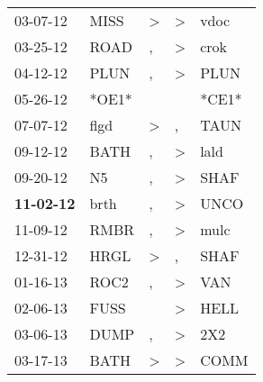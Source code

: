 \begin{supertabular}{p{0.07\textwidth}p{0.06\textwidth}p{0.02\textwidth}p{0.02\textwidth}p{0.06\textwidth}}
          03-07-12\textsuperscript{} &           MISS\textsuperscript{} &     \textgreater &     \textgreater &           vdoc\textsuperscript{} \\
          03-25-12\textsuperscript{} &           ROAD\textsuperscript{} &                , &     \textgreater &           crok\textsuperscript{} \\
          04-12-12\textsuperscript{} &           PLUN\textsuperscript{} &                , &     \textgreater &           PLUN\textsuperscript{} \\
          05-26-12\textsuperscript{} &                            *OE1* &                  &                  &                            *CE1* \\
          07-07-12\textsuperscript{} &           flgd\textsuperscript{} &     \textgreater &                , &           TAUN\textsuperscript{} \\
          09-12-12\textsuperscript{} &           BATH\textsuperscript{} &                , &     \textgreater &           lald\textsuperscript{} \\
          09-20-12\textsuperscript{} &             N5\textsuperscript{} &                , &     \textgreater &           SHAF\textsuperscript{} \\
 \textbf{11-02-12\textsuperscript{}} &           brth\textsuperscript{} &                , &     \textgreater &           UNCO\textsuperscript{} \\
          11-09-12\textsuperscript{} &           RMBR\textsuperscript{} &                , &     \textgreater &           mulc\textsuperscript{} \\
          12-31-12\textsuperscript{} &           HRGL\textsuperscript{} &     \textgreater &                , &           SHAF\textsuperscript{} \\
          01-16-13\textsuperscript{} &           ROC2\textsuperscript{} &                , &     \textgreater &            VAN\textsuperscript{} \\
          02-06-13\textsuperscript{} &           FUSS\textsuperscript{} &                  &     \textgreater &           HELL\textsuperscript{} \\
          03-06-13\textsuperscript{} &           DUMP\textsuperscript{} &                , &     \textgreater &            2X2\textsuperscript{} \\
          03-17-13\textsuperscript{} &           BATH\textsuperscript{} &     \textgreater &     \textgreater &           COMM\textsuperscript{} \\

\end{supertabular}
